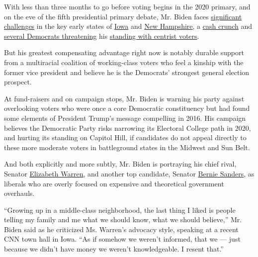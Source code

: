 With less than three months to go before voting begins in the 2020
primary, and on the eve of the fifth presidential primary debate, Mr.
Biden faces
\href{https://www.nytimes3xbfgragh.onion/2019/11/16/us/politics/iowa-poll-democrats.html}{significant
challenges} in the key early states of
\href{https://www.nytimes3xbfgragh.onion/2019/08/22/us/politics/joe-biden-trump-2020.html}{Iowa}
and
\href{https://www.realclearpolitics.com/epolls/2020/president/nh/new_hampshire_democratic_presidential_primary-6276.html\#polls}{New
Hampshire}, a
\href{https://www.nytimes3xbfgragh.onion/2019/10/16/us/politics/democratic-fundraising-joe-biden.html}{cash
crunch} and
\href{https://www.nytimes3xbfgragh.onion/2019/11/15/us/politics/deval-patrick-michael-bloomberg-2020.html}{several
Democrats threatening} his
\href{https://www.nytimes3xbfgragh.onion/2019/11/04/us/politics/pete-buttigieg-iowa.html}{standing
with centrist voters}.

But his greatest compensating advantage right now is notably durable
support from a multiracial coalition of working-class voters who feel a
kinship with the former vice president and believe he is the Democrats'
strongest general election prospect.

At fund-raisers and on campaign stops, Mr. Biden is warning his party
against overlooking voters who were once a core Democratic constituency
but had found some elements of President Trump's message compelling in
2016. His campaign believes the Democratic Party risks narrowing its
Electoral College path in 2020, and hurting its standing on Capitol
Hill, if candidates do not appeal directly to these more moderate voters
in battleground states in the Midwest and Sun Belt.

And both explicitly and more subtly, Mr. Biden is portraying his chief
rival, Senator
\href{https://www.nytimes3xbfgragh.onion/interactive/2020/us/elections/elizabeth-warren.html}{Elizabeth
Warren}, and another top candidate, Senator
\href{https://www.nytimes3xbfgragh.onion/interactive/2020/us/elections/bernie-sanders.html}{Bernie
Sanders}, as liberals who are overly focused on expensive and
theoretical government overhauls.

``Growing up in a middle-class neighborhood, the last thing I liked is
people telling my family and me what we should know, what we should
believe,'' Mr. Biden said as he criticized Ms. Warren's advocacy style,
speaking at a recent CNN town hall in Iowa. ``As if somehow we weren't
informed, that we --- just because we didn't have money we weren't
knowledgeable. I resent that.''

